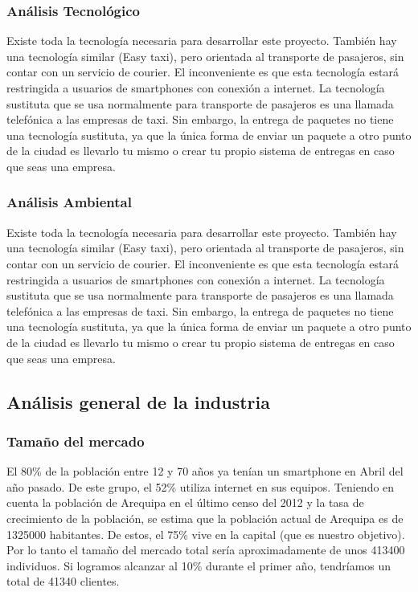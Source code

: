 \subsubsection{Análisis Tecnológico}
Existe toda la tecnología necesaria para desarrollar este proyecto. También hay una tecnología similar (Easy taxi), pero orientada al transporte de pasajeros, sin contar con un servicio de courier. El inconveniente es que esta tecnología estará restringida a usuarios de smartphones con conexión a internet. La tecnología sustituta que se usa normalmente para transporte de pasajeros es una llamada telefónica a las empresas de taxi. Sin embargo, la entrega de paquetes no tiene una tecnología sustituta, ya que la única forma de enviar un paquete a otro punto de la ciudad es llevarlo tu mismo o crear tu propio sistema de entregas en caso que seas una empresa.

\subsubsection{Análisis Ambiental}
Existe toda la tecnología necesaria para desarrollar este proyecto. También hay una tecnología similar (Easy taxi), pero orientada al transporte de pasajeros, sin contar con un servicio de courier. El inconveniente es que esta tecnología estará restringida a usuarios de smartphones con conexión a internet. La tecnología sustituta que se usa normalmente para transporte de pasajeros es una llamada telefónica a las empresas de taxi. Sin embargo, la entrega de paquetes no tiene una tecnología sustituta, ya que la única forma de enviar un paquete a otro punto de la ciudad es llevarlo tu mismo o crear tu propio sistema de entregas en caso que seas una empresa.


\subsection{Análisis general de la industria}
\subsubsection{Tamaño del mercado}
El 80\% de la población entre 12 y 70 años ya tenían un smartphone en Abril del año pasado. De este grupo, el 52\% utiliza internet en sus equipos. Teniendo en cuenta la población de Arequipa en el último censo del 2012 y la tasa de crecimiento de la población, se estima que la población actual de Arequipa es de 1325000 habitantes. De estos, el 75\% vive en la capital (que es nuestro objetivo). Por lo tanto el tamaño del mercado total sería aproximadamente de unos 413400 individuos. Si logramos alcanzar al 10\% durante el primer año, tendríamos un total de 41340 clientes.

